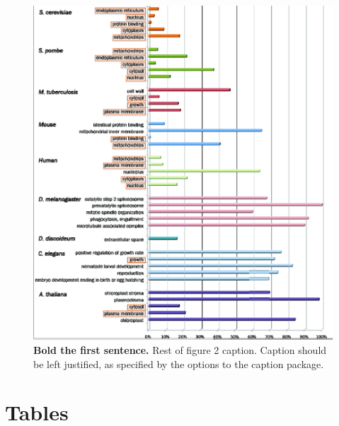 \documentclass[12pt]{article}
\begin{document}
\begin{figure}[!ht]
\begin{center}
\includegraphics[width=6in]{rel-contrib.eps}
\end{center}
\caption{
{\bf Bold the first sentence.}  Rest of figure 2  caption.  Caption 
should be left justified, as specified by the options to the caption 
package.
}
\label{fig:rel-contrib}
\end{figure}

\section*{Tables}

\label{tab:top50}
\end{document}
